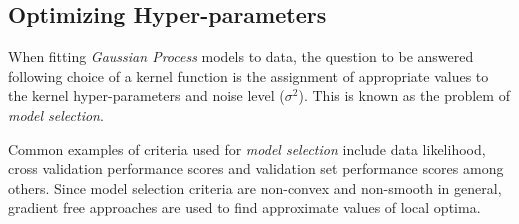 \documentclass[referee,a4paper,12pt,traditabstract]{swsc}
\begin{document}
\begin{linenumbers}

\subsection{Optimizing Hyper-parameters} \label{sec:hyp}

When fitting \emph{Gaussian Process} models to data, the question to be answered following choice of a kernel function is the assignment of appropriate values to the kernel hyper-parameters and noise level ($\sigma^2$). This is known as the problem of \emph{model selection}.

Common examples of criteria used for \emph{model selection} include data likelihood, cross validation performance scores and validation set performance scores among others. Since model selection criteria are non-convex and non-smooth in general, gradient free approaches are used to find approximate values of local optima.


\end{linenumbers}
\end{document}
